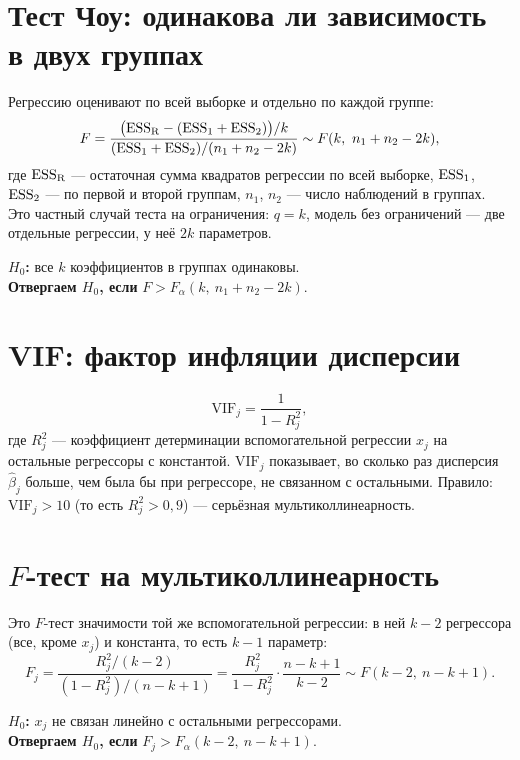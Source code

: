 \documentclass[12pt,a4paper]{article}
\newcommand{\decision}[2]{\par\smallskip\noindent\textbf{$H_0$:} #1\\
  \textbf{Отвергаем $H_0$, если} #2\par}
\begin{document}
\section{Тест Чоу: одинакова ли зависимость в двух группах}
Регрессию оценивают по всей выборке и отдельно по каждой группе:
\[
  F = \frac{\bigl(\mathrm{ESS}_{\mathrm R} - (\mathrm{ESS}_1 + \mathrm{ESS}_2)\bigr)/k}
           {(\mathrm{ESS}_1 + \mathrm{ESS}_2)/(n_1 + n_2 - 2k)}
    \sim F(k,\ n_1 + n_2 - 2k),
\]
где $\mathrm{ESS}_{\mathrm R}$ — остаточная сумма квадратов регрессии по всей
выборке, $\mathrm{ESS}_1$, $\mathrm{ESS}_2$ — по первой и второй группам, $n_1$, $n_2$ —
число наблюдений в группах. Это частный случай теста на ограничения:
$q = k$, модель без ограничений — две отдельные регрессии, у неё $2k$
параметров.
\decision{все $k$ коэффициентов в группах одинаковы.}{$F > F_\alpha(k,\ n_1 + n_2 - 2k)$.}

\section{VIF: фактор инфляции дисперсии}
\[
  \mathrm{VIF}_j = \frac{1}{1 - R_j^2},
\]
где $R_j^2$ — коэффициент детерминации вспомогательной регрессии $x_j$ на
остальные регрессоры с константой. $\mathrm{VIF}_j$ показывает, во сколько
раз дисперсия $\widehat\beta_j$ больше, чем была бы при регрессоре, не
связанном с остальными. Правило: $\mathrm{VIF}_j > 10$ (то есть
$R_j^2 > 0{,}9$) — серьёзная мультиколлинеарность.

\section{\texorpdfstring{$F$}{F}-тест на мультиколлинеарность}
Это $F$-тест значимости той же вспомогательной регрессии: в ней $k - 2$
регрессора (все, кроме $x_j$) и константа, то есть $k - 1$ параметр:
\[
  F_j = \frac{R_j^2/(k - 2)}{(1 - R_j^2)/(n - k + 1)}
      = \frac{R_j^2}{1 - R_j^2}\cdot\frac{n - k + 1}{k - 2}
      \sim F(k - 2,\ n - k + 1).
\]
\decision{$x_j$ не связан линейно с остальными регрессорами.}{$F_j > F_\alpha(k - 2,\ n - k + 1)$.}
\end{document}
